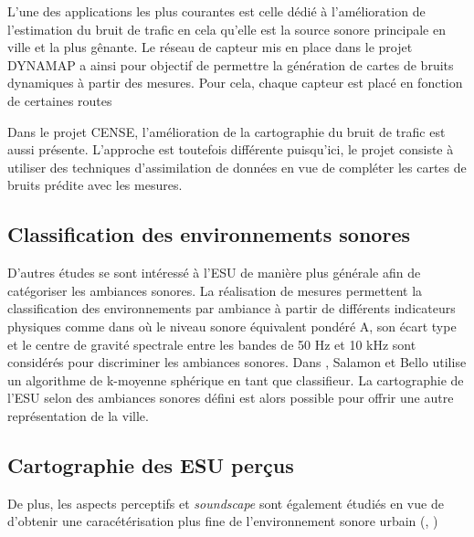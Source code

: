 L'une des applications les plus courantes est celle dédié à l'amélioration de l'estimation du bruit de trafic en cela qu'elle est la source sonore principale en ville et la plus gênante. Le réseau de capteur mis en place dans le projet DYNAMAP a ainsi pour objectif de permettre la génération de cartes de bruits dynamiques à partir des mesures. Pour cela, chaque capteur est placé en fonction de certaines routes


Dans le projet CENSE, l'amélioration de la cartographie du bruit de trafic est aussi présente. L'approche est toutefois différente puisqu'ici, le projet consiste à utiliser des techniques d'assimilation de données en vue de compléter les cartes de bruits prédite avec les mesures. 

\subsection{Classification des environnements sonores}
D'autres études se sont intéressé à l'ESU de manière plus générale afin de catégoriser les ambiances sonores. La réalisation de mesures permettent la classification des environnements par ambiance à partir de différents indicateurs physiques comme dans \cite{can_describing_2015} où le niveau sonore équivalent pondéré A, son écart type et le centre de gravité spectrale entre les bandes de 50 Hz et 10 kHz sont considérés pour discriminer les ambiances sonores. Dans \cite{salamon2015unsupervised}, Salamon et Bello utilise un algorithme de k-moyenne sphérique en tant que classifieur. La cartographie de l'ESU selon des ambiances sonores défini est alors possible pour offrir une autre représentation de la ville. 

\subsection{Cartographie des ESU perçus}

De plus, les aspects perceptifs et \textit{soundscape} sont également étudiés en vue de d'obtenir une caracétérisation plus fine de l'environnement sonore urbain (\cite{can_describing_2015}, \cite{brocolini_measurements_2013})

